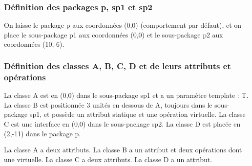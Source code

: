 \documentclass[a4paper,11pt]{report}
\newcommand{\inputTikZ}[1]{%
  }%
\newcommand{\inputTikZ}[1]{%
    \texttt{[image: fig/\#1.pdf]}%
  }%
\begin{document}
\subsubsection{Définition des packages p, sp1 et sp2}

On laisse le package p aux coordonnées (0,0) (comportement par défaut), et on place le sous-package p1 aux coordonnées (0,0) et le sous-package p2 aux coordonnées (10,-6).

{\color{red!70!black}
\vspace{-0.4cm}
\vspace{-0.4cm}
\vspace{-0.4cm}

}

\begin{center}
\inputTikZ{figure32}
\end{center}

\subsubsection{Définition des classes A, B, C, D et de leurs attributs et opérations}

La classe A est en (0,0) dans le sous-package sp1 et a un paramètre template : T. La classe B est positionnée 3 unités en dessous de A, toujours dans le sous-package sp1, et  possède un attribut statique et une opération virtuelle. La classe C est une interface en (0,0) dans le sous-package sp2. La classe D est placée en (2,-11) dans le package p.

La classe A a deux attributs. La classe B a un attribut et deux opérations dont une virtuelle. La classe C a deux attributs. La classe D a un attribut.

\vspace{-0.4cm}
{\color{red!70!black}
\vspace{-0.4cm}
}
\vspace{-0.4cm}
{\color{red!70!black}
\vspace{-0.4cm}
}
\vspace{-0.4cm}
{\color{red!70!black}
\vspace{-0.4cm}
}

\end{document}
